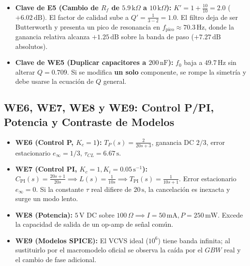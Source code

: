 \documentclass[11pt, a4paper]{article}
\begin{document}
\begin{itemize}[noitemsep]
    \item \textbf{Clave de E5 (Cambio de $R_f$ de $5.9\,\text{k}\Omega$ a $10\,\text{k}\Omega$):} $K' = 1 + \frac{10}{10} = 2.0$ ($+6.02\,\text{dB}$). El factor de calidad sube a $Q' = \frac{1}{3 - 2} = 1.0$. El filtro deja de ser Butterworth y presenta un pico de resonancia en $f_{\text{pico}} \approx 70.3\,\text{Hz}$, donde la ganancia relativa alcanza $+1.25\,\text{dB}$ sobre la banda de paso ($+7.27\,\text{dB}$ absolutos).
    \item \textbf{Clave de WE5 (Duplicar capacitores a $200\,\text{nF}$):} $f_0$ baja a $49.7\,\text{Hz}$ sin alterar $Q = 0.709$. Si se modifica \textbf{un solo} componente, se rompe la simetría y debe usarse la ecuación de $Q$ general.
\end{itemize}

\subsection*{WE6, WE7, WE8 y WE9: Control P/PI, Potencia y Contraste de Modelos}
\begin{itemize}[noitemsep]
    \item \textbf{WE6 (Control P, $K_c=1$):} $T_P(s) = \frac{2}{20s+3}$, ganancia DC $2/3$, error estacionario $e_\infty = 1/3$, $\tau_{CL} = 6.67\,\text{s}$.
    \item \textbf{WE7 (Control PI, $K_c=1, K_i=0.05\,\text{s}^{-1}$):} $C_{\text{PI}}(s) = \frac{20s+1}{20s} \implies L(s) = \frac{1}{10s} \implies T_{\text{PI}}(s) = \frac{1}{10s+1}$. Error estacionario $e_\infty = 0$. Si la constante $\tau$ real difiere de $20\,\text{s}$, la cancelación es inexacta y surge un modo lento.
    \item \textbf{WE8 (Potencia):} $5\,\text{V}$ DC sobre $100\,\Omega \implies I = 50\,\text{mA}, P = 250\,\text{mW}$. Excede la capacidad de salida de un op-amp de señal común.
    \item \textbf{WE9 (Modelos SPICE):} El VCVS ideal ($10^6$) tiene banda infinita; al sustituirlo por el macromodelo oficial se observa la caída por el $GBW$ real y el cambio de fase adicional.
\end{itemize}

\newpage
\end{document}
